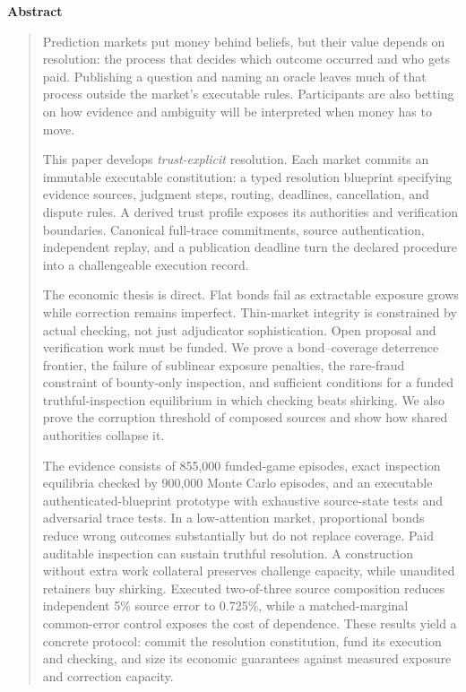 \documentclass[10pt]{article}
\renewenvironment{abstract}{%
  \centerline{\bfseries\normalsize Abstract}%
  \vspace{0.5ex}%
  \begin{quote}\small
}{%
  \end{quote}%
}
\begin{document}
\begin{abstract}

Prediction markets put money behind beliefs, but their value depends on resolution: the process that decides which outcome occurred and who gets paid. Publishing a question and naming an oracle leaves much of that process outside the market's executable rules. Participants are also betting on how evidence and ambiguity will be interpreted when money has to move.

This paper develops \emph{trust-explicit} resolution. Each market commits an immutable executable constitution: a typed resolution blueprint specifying evidence sources, judgment steps, routing, deadlines, cancellation, and dispute rules. A derived trust profile exposes its authorities and verification boundaries. Canonical full-trace commitments, source authentication, independent replay, and a publication deadline turn the declared procedure into a challengeable execution record.

The economic thesis is direct. Flat bonds fail as extractable exposure grows while correction remains imperfect. Thin-market integrity is constrained by actual checking, not just adjudicator sophistication. Open proposal and verification work must be funded. We prove a bond--coverage deterrence frontier, the failure of sublinear exposure penalties, the rare-fraud constraint of bounty-only inspection, and sufficient conditions for a funded truthful-inspection equilibrium in which checking beats shirking. We also prove the corruption threshold of composed sources and show how shared authorities collapse it.

The evidence consists of 855{,}000 funded-game episodes, exact inspection equilibria checked by 900{,}000 Monte Carlo episodes, and an executable authenticated-blueprint prototype with exhaustive source-state tests and adversarial trace tests. In a low-attention market, proportional bonds reduce wrong outcomes substantially but do not replace coverage. Paid auditable inspection can sustain truthful resolution. A construction without extra work collateral preserves challenge capacity, while unaudited retainers buy shirking. Executed two-of-three source composition reduces independent 5\% source error to 0.725\%, while a matched-marginal common-error control exposes the cost of dependence. These results yield a concrete protocol: commit the resolution constitution, fund its execution and checking, and size its economic guarantees against measured exposure and correction capacity.

\end{abstract}
\end{document}
